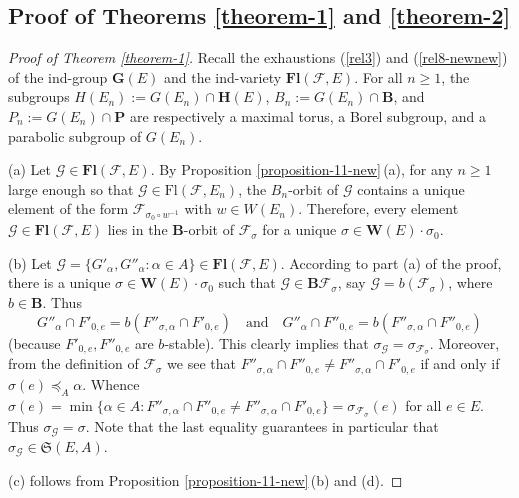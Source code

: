 \documentclass[12pt]{amsart}
\theoremstyle{definition}
\begin{document}
\subsection{Proof of Theorems \ref{theorem-1} and \ref{theorem-2}}

\label{section-5-4}







\begin{proof}[Proof of Theorem \ref{theorem-1}]
Recall the exhaustions (\ref{rel3}) and (\ref{rel8-newnew}) of the ind-group $\mathbf{G}(E)$ and the ind-variety $\mathbf{Fl}(\mathcal{F},E)$.
For all $n\geq 1$, the subgroups $H(E_n):=G(E_n)\cap\mathbf{H}(E)$, $B_n:=G(E_n)\cap\mathbf{B}$, and $P_n:=G(E_n)\cap\mathbf{P}$ are respectively a maximal torus, a Borel subgroup, and a parabolic subgroup of $G(E_n)$.

{\rm (a)} Let $\mathcal{G}\in\mathbf{Fl}(\mathcal{F},E)$. By Proposition \ref{proposition-11-new}\,{\rm (a)}, for any $n\geq 1$ large enough so that $\mathcal{G}\in\mathrm{Fl}(\mathcal{F},E_n)$,
the $B_n$-orbit of $\mathcal{G}$ contains a unique element of the form $\mathcal{F}_{\sigma_0\circ w^{-1}}$ with $w\in W(E_n)$.
Therefore, every element $\mathcal{G}\in\mathbf{Fl}(\mathcal{F},E)$ lies in the $\mathbf{B}$-orbit of $\mathcal{F}_\sigma$ for a unique $\sigma\in\mathbf{W}(E)\cdot\sigma_0$.


{\rm (b)}
Let $\mathcal{G}=\{G'_\alpha,G''_\alpha:\alpha\in A\}\in\mathbf{Fl}(\mathcal{F},E)$.
According to part {\rm (a)} of the proof, there is a unique $\sigma\in\mathbf{W}(E)\cdot\sigma_0$ such that $\mathcal{G}\in\mathbf{B}\mathcal{F}_\sigma$, say $\mathcal{G}=b(\mathcal{F}_\sigma)$, where $b\in\mathbf{B}$. Thus
\[G''_\alpha\cap F'_{0,e}=b(F''_{\sigma,\alpha}\cap F'_{0,e})\quad\mbox{and}\quad G''_\alpha\cap F''_{0,e}=b(F''_{\sigma,\alpha}\cap F''_{0,e})\]
(because $F'_{0,e},F''_{0,e}$ are $b$-stable). This clearly implies that $\sigma_\mathcal{G}=\sigma_{\mathcal{F}_\sigma}$.
Moreover, from the definition of $\mathcal{F}_\sigma$ we see that $F''_{\sigma,\alpha}\cap F''_{0,e}\not= F''_{\sigma,\alpha}\cap F'_{0,e}$ if and only if $\sigma(e)\preceq_A\alpha$.
Whence $\sigma(e)=\min\{\alpha\in A:F''_{\sigma,\alpha}\cap F''_{0,e}\not= F''_{\sigma,\alpha}\cap F'_{0,e}\}=\sigma_{\mathcal{F}_\sigma}(e)$ for all $e\in E$. Thus $\sigma_{\mathcal{G}}=\sigma$. Note that the last equality guarantees in particular that $\sigma_\mathcal{G}\in\mathfrak{S}(E,A)$.

{\rm (c)}
follows from Proposition \ref{proposition-11-new}\,{\rm (b)} and {\rm (d)}.



\end{proof}
\end{document}
